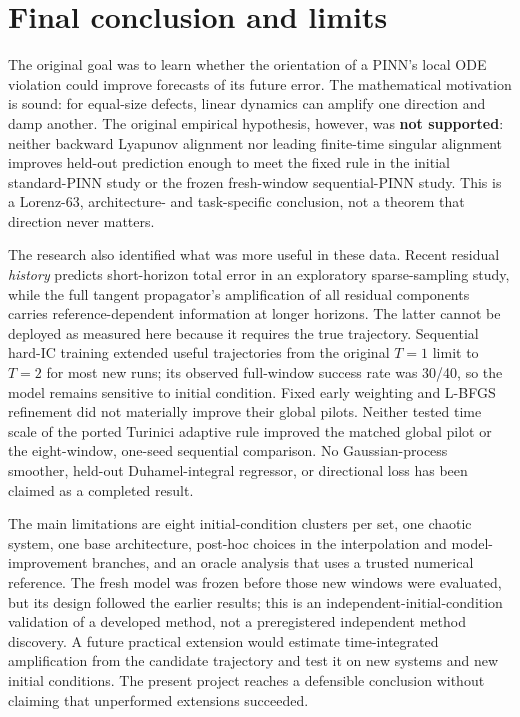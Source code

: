 \documentclass[11pt,a4paper]{article}
\begin{document}
\section{Final conclusion and limits}
The original goal was to learn whether the orientation of a PINN's local ODE violation could improve forecasts of its future error. The mathematical motivation is sound: for equal-size defects, linear dynamics can amplify one direction and damp another. The original empirical hypothesis, however, was \textbf{not supported}: neither backward Lyapunov alignment nor leading finite-time singular alignment improves held-out prediction enough to meet the fixed rule in the initial standard-PINN study or the frozen fresh-window sequential-PINN study. This is a Lorenz-63, architecture- and task-specific conclusion, not a theorem that direction never matters.

The research also identified what was more useful in these data. Recent residual \emph{history} predicts short-horizon total error in an exploratory sparse-sampling study, while the full tangent propagator's amplification of all residual components carries reference-dependent information at longer horizons. The latter cannot be deployed as measured here because it requires the true trajectory. Sequential hard-IC training extended useful trajectories from the original $T=1$ limit to $T=2$ for most new runs; its observed full-window success rate was 30/40, so the model remains sensitive to initial condition. Fixed early weighting and L-BFGS refinement did not materially improve their global pilots. Neither tested time scale of the ported Turinici adaptive rule improved the matched global pilot or the eight-window, one-seed sequential comparison. No Gaussian-process smoother, held-out Duhamel-integral regressor, or directional loss has been claimed as a completed result.

The main limitations are eight initial-condition clusters per set, one chaotic system, one base architecture, post-hoc choices in the interpolation and model-improvement branches, and an oracle analysis that uses a trusted numerical reference. The fresh model was frozen before those new windows were evaluated, but its design followed the earlier results; this is an independent-initial-condition validation of a developed method, not a preregistered independent method discovery. A future practical extension would estimate time-integrated amplification from the candidate trajectory and test it on new systems and new initial conditions. The present project reaches a defensible conclusion without claiming that unperformed extensions succeeded.
\end{document}
